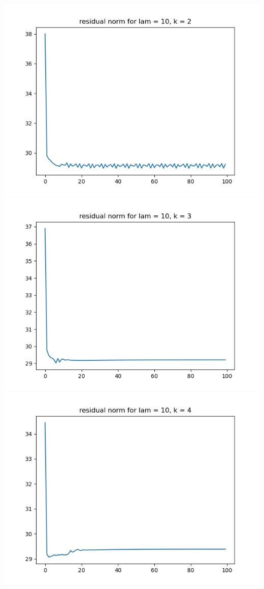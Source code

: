 \documentclass{article}
\begin{document}
\begin{enumerate}
\begin{enumerate}
\begin{center}
			\includegraphics[scale=.3]{hw7p1 residual norm for lamcount = 3, k = 2}
			\includegraphics[scale=.3]{hw7p1 residual norm for lamcount = 3, k = 3}
			\includegraphics[scale=.3]{hw7p1 residual norm for lamcount = 3, k = 4}

\end{center}
\end{enumerate}
\end{enumerate}
\end{document}
